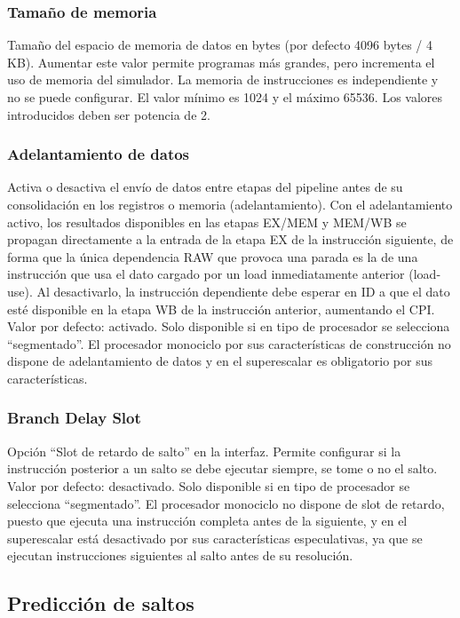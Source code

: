 \documentclass[../main.tex]{subfiles}
\begin{document}
\subsubsection*{Tamaño de memoria}

Tamaño del espacio de memoria de datos en bytes (por defecto 4096 bytes / 4 KB). Aumentar este valor permite programas más grandes, pero incrementa el uso de memoria del simulador. La memoria de instrucciones es independiente y no se puede configurar. El valor mínimo es 1024 y el máximo 65536. Los valores introducidos deben ser potencia de 2.

\subsubsection*{Adelantamiento de datos}

Activa o desactiva el envío de datos entre etapas del pipeline antes de su consolidación en los registros o memoria (adelantamiento). Con el adelantamiento activo, los resultados disponibles en las etapas EX/MEM y MEM/WB se propagan directamente a la entrada de la etapa EX de la instrucción siguiente, de forma que la única dependencia RAW que provoca una parada es la de una instrucción que usa el dato cargado por un load inmediatamente anterior (load-use). Al desactivarlo, la instrucción dependiente debe esperar en ID a que el dato esté disponible en la etapa WB de la instrucción anterior, aumentando el CPI. Valor por defecto: activado. Solo disponible si en tipo de procesador se selecciona ``segmentado''. El procesador monociclo por sus características de construcción no dispone de adelantamiento de datos y en el superescalar es obligatorio por sus características.

\subsubsection*{Branch Delay Slot}

Opción ``Slot de retardo de salto'' en la interfaz. Permite configurar si la instrucción posterior a un salto se debe ejecutar siempre, se tome o no el salto. Valor por defecto: desactivado. Solo disponible si en tipo de procesador se selecciona ``segmentado''. El procesador monociclo no dispone de slot de retardo, puesto que ejecuta una instrucción completa antes de la siguiente, y en el superescalar está desactivado por sus características especulativas, ya que se ejecutan instrucciones siguientes al salto antes de su resolución.

\subsection{Predicción de saltos}
\end{document}
